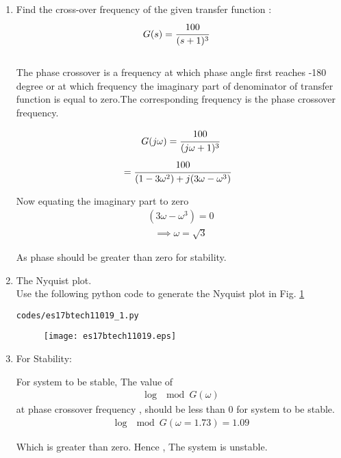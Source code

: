 \begin{enumerate}[label=\thesection.\arabic*.,ref=\thesection.\theenumi]

\item  Find the cross-over frequency of the  given transfer function :
\begin{align}
\label{eq:es17btech11019_system}
G(s) &= \cfrac{100}{(s+1)^3}
\end{align}
\\
\solution The phase crossover is a frequency at which phase angle first reaches -180 degree or at which frequency the imaginary part of denominator of transfer function is equal to zero.The corresponding frequency is the phase crossover frequency.


\begin{align}
G(j\omega)=\cfrac{100}{(j\omega+1)^3}
\end{align}
\begin{align}
 &= \cfrac{100}{(1-3\omega^2)+j(3\omega-\omega^3)}
\end{align}
     
Now equating the imaginary part to zero
\begin{align}
(3\omega-\omega^3)=0
\end{align}  
\begin{align}
\implies \omega = \sqrt{3}
\end{align}

As phase should be greater than zero for stability.

\item  The Nyquist plot.
\\
\solution Use the following python code to generate the Nyquist plot in Fig.  \ref{fig:es17btech11019}
\begin{lstlisting}
codes/es17btech11019_1.py
\end{lstlisting}
%
\begin{figure}[!h]
  \texttt{[image: es17btech11019.eps]}
  \caption{}
  \label{fig:es17btech11019}
\end{figure}

\item For Stability: 

For system to be stable, The value of
\begin{align}
 \log\mod G(\omega) 
\end{align} 
at phase crossover frequency , should be less than 0 for system to be stable.
\begin{align}
  \log\mod G(\omega=1.73) = 1.09    
\end{align}
 
Which is greater than zero.
Hence , The system is unstable.


\end{enumerate}